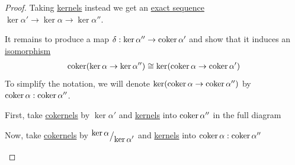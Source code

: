 \documentclass[../../../main]{subfiles}
\begin{document}
\begin{proof}
  Taking \hyperref[def:categorical-kernel]{kernels} instead we get an \hyperref[def:exact-complex]{exact sequence} \(\ker \alpha' \to \ker \alpha \to \ker \alpha''\).

  It remains to produce a map \(\delta: \ker \alpha'' \to \operatorname*{coker} \alpha'\) and show that it induces an \hyperref[def:categorical-isomorphism]{isomorphism}
  \begin{align*}
    \operatorname*{coker}(\ker \alpha \to \ker \alpha'') \cong \ker(\operatorname*{coker} \alpha \to \operatorname*{coker} \alpha')
  \end{align*}
  To simplify the notation, we will denote \(\ker(\operatorname*{coker} \alpha \to \operatorname*{coker} \alpha'')\) by \(\operatorname*{coker} \alpha : \operatorname*{coker} \alpha''\).

  First, take \hyperref[def:categorical-cokernel]{cokernels} by \(\ker \alpha'\) and \hyperref[def:categorical-kernel]{kernels} into \(\operatorname*{coker} \alpha''\) in the full diagram
  \begin{center}
  \end{center}
  Now, take \hyperref[def:categorical-cokernel]{cokernels} by \({^{\textstyle \ker \alpha}\big/_{\textstyle \ker \alpha'}}\) and \hyperref[def:categorical-kernel]{kernels} into \(\operatorname*{coker} \alpha : \operatorname*{coker} \alpha''\)
  \begin{center}
\end{center}
\end{proof}
\end{document}
